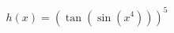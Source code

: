 \documentclass[preview]{standalone}
\begin{document}
\begin{align*}
h(x)=(\tan(\sin(x^4)))^5
\end{align*}
\end{document}
